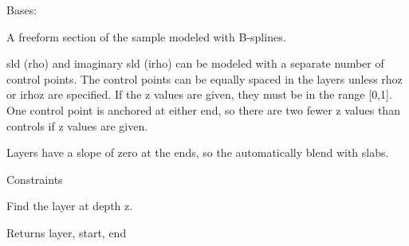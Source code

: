 \documentclass[letterpaper,10pt,english]{sphinxmanual}
\begin{document}

\begin{fulllineitems}
\label{api/freeform:refl1d.freeform.FreeformInterface01}
Bases: {\hyperref[api/model:refl1d.model.Layer]{}}

A freeform section of the sample modeled with B-splines.

sld (rho) and imaginary sld (irho) can be modeled with a separate
number of control points. The control points can be equally spaced
in the layers unless rhoz or irhoz are specified. If the z values
are given, they must be in the range {[}0,1{]}.  One control point is
anchored at either end, so there are two fewer z values than controls
if z values are given.

Layers have a slope of zero at the ends, so the automatically blend
with slabs.

\begin{fulllineitems}
\label{api/freeform:refl1d.freeform.FreeformInterface01.constraints}
Constraints

\end{fulllineitems}


\begin{fulllineitems}
\label{api/freeform:refl1d.freeform.FreeformInterface01.find}
Find the layer at depth z.

Returns layer, start, end

\end{fulllineitems}


\begin{fulllineitems}
\label{api/freeform:refl1d.freeform.FreeformInterface01.parameters}
\end{fulllineitems}


\begin{fulllineitems}
\label{api/freeform:refl1d.freeform.FreeformInterface01.render}
\end{fulllineitems}


\end{fulllineitems}
\end{document}
